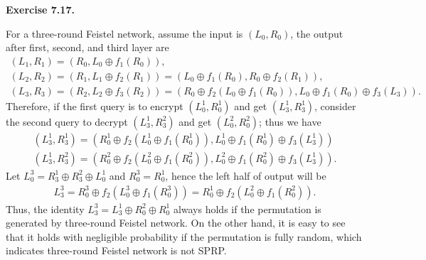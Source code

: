 \documentclass[a4paper]{article}
\newenvironment{exercise}[1]{
	\par
	\noindent\textbf{Exercise #1.}\quad
}{
	\par
	\bigskip
}
\begin{document}
\begin{exercise}{7.17}
    For a three-round Feistel network, assume the input is $(L_0,R_0)$, the
    output after first, second, and third layer are 
    \begin{gather*}
        (L_1,R_1)=(R_0,L_0\oplus f_1(R_0)),\\
        (L_2,R_2)=(R_1,L_1\oplus f_2(R_1))=(L_0\oplus f_1(R_0),R_0\oplus f_2(R_1)),\\
        (L_3,R_3)=(R_2,L_2\oplus f_3(R_2))=(R_0\oplus f_2(L_0\oplus f_1(R_0)),L_0\oplus f_1(R_0)\oplus f_3(L_3)).
    \end{gather*}
    Therefore, if the first query is to encrypt $(L_0^1,R_0^1)$ and get $(L_3^1,R_3^1)$,
    consider the second query to decrypt $(L_3^1,R_3^2)$ and get $(L_0^2,R_0^2)$; thus we have
    \begin{gather*}
    (L_3^1,R_3^1)=(R_0^1\oplus f_2(L_0^1\oplus f_1(R_0^1)),L_0^1\oplus f_1(R_0^1)\oplus f_3(L_3^1))\\
    (L_3^1,R_3^2)=(R_0^2\oplus f_2(L_0^2\oplus f_1(R_0^2)),L_0^2\oplus f_1(R_0^2)\oplus f_3(L_3^1)).
    \end{gather*}
    Let $L_0^3=R_3^1\oplus R_3^2\oplus L_0^1$ and $R_0^3=R_0^1$, hence the left half of output will be
    \begin{align*}
        L_3^3=R_0^3\oplus f_2(L_0^3\oplus f_1(R_0^3))=R_0^1\oplus f_2(L_0^2\oplus f_1(R_0^2)).
    \end{align*}
    Thus, the identity $L_3^3=L_3^1\oplus R_0^2\oplus R_0^1$ always holds if the permutation is generated by 
    three-round Feistel network. On the other hand, it is easy to see that it holds with negligible probability 
    if the permutation is fully random, which indicates three-round Feistel network is not SPRP.
\end{exercise}
\end{document}
